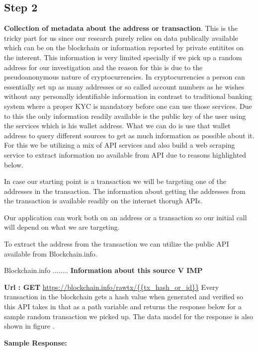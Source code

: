 \documentclass{article}
\begin{document}
    \subsection{Step 2}
        \textbf{Collection of metadata about the address or transaction}. 
        This is the tricky part for us since our research purely relies on data publically available which can be on the blockchain or information reported by private entitites on the interent. This information is very limited specially if we pick up a random address for our investigation and the reason for this is due to the pseudoanonymous nature of cryptocurrencies. In cryptocurrencies a person can essentially set up as many addresses or so called account numbers as he wishes without any personally identifiable information in contrast to traditional banking system where a proper KYC is mandatory before one can use those services. Due to this the only information readily available is the public key of the user using the services which is his wallet address. What we can do is use that wallet address to query different sources to get as much information as possible about it. For this we be utilizing a mix of API services and also build a web scraping service to extract information no available from API due to reasons highlighted below.
        
        In case our starting point is a transaction we will be targeting one of the addresses in the transaction. The information about getting the addresses from the transaction is available readily on the internet thorugh APIs.
        
        Our application can work both on an address or a transaction so our initial call will depend on what we are targeting. 
        
        To extract the address from the transaction we can utilize the public API available from Blockchain.info\cite{blockchain.com}. 
        
        Blockchain.info ........ \textbf{Information about this source V IMP}
        
        \textbf{Url : GET} \url{https://blockchain.info/rawtx/{{tx_hash_or_id}}}
        Every transaction in the blockchain gets a hash value when generated and verified so this API takes in that as a path variable and returns the response below for a sample random transaction we picked up. The data model for the response is also shown in figure \cite{Fig}.
        
        \textbf{Sample Response: }
        
        
\end{document}
